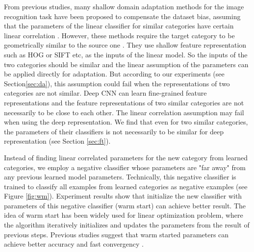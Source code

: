 From previous studies, many shallow domain adaptation methods for the image recognition task have been proposed to compensate the dataset bias, assuming that the parameters of the linear classifier for similar categories have certain linear correlation \cite{daume2009frustratingly} \cite{yang2007adapting} \cite{aytar2011tabula}.
However, these methods require the target category to be geometrically similar to the source one \cite{aytar2011tabula}. They use shallow feature representation such as HOG or SIFT etc, as the inputs of the linear model. So the inputs of the two categories should be similar and the linear assumption of the parameters can be applied directly for adaptation. But according to our experiments (see Section\ref{sec:da}), this assumption could fail when the representations of two categories are not similar.
Deep CNN can learn fine-grained feature representations and the feature representations of two similar categories are not necessarily to be close to each other. The linear correlation assumption may fail when using the deep representation. We find that even for two similar categories, the parameters of their classifiers is not necessarily to be similar for deep representation (see Section \ref{sec:ft}).

Instead of finding linear correlated parameters for the new category from learned categories, we employ a negative classifier whose parameters are "far away" from any previous learned model parameters. Technically, this negative classifier is trained to classify all examples from learned categories as negative examples (see Figure \ref{fig:wm}). Experiment results show that initialize the new classifier with parameters of this negative classifier (warm start) can achieve better result. The idea of warm start has been widely used for linear optimization problem, where the algorithm iteratively initializes and updates the parameters from the result of previous steps. Previous studies suggest that warm started parameters can achieve better accuracy and fast convergency \cite{yildirim2002warm} \cite{john2008implementation} \cite{zeilinger2011real} \cite{chuwarm}.

